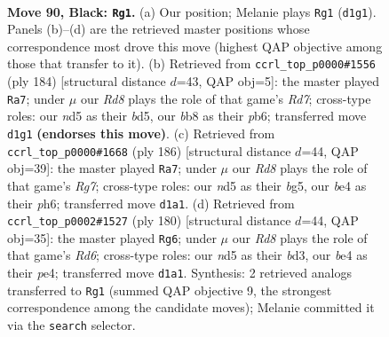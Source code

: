 \documentclass[11pt]{article}
\begin{document}
\clearpage

\begin{figure}[p]\centering
\begin{subfigure}{0.46\textwidth}\centering
\resizebox{\linewidth}{!}{%
\newchessgame
\chessboard[
  setfen={1B4k1/8/1P3R2/3N4/P3B1b1/7p/2K5/3r4 b - - 2 90},
  showmover=false,
  pgfstyle=straightmove, color=movearrow, markmove={d1-g1}
]}
\caption{}
\end{subfigure}\hfill
\begin{subfigure}{0.46\textwidth}\centering
\resizebox{\linewidth}{!}{%
\newchessgame
\chessboard[
  setfen={5k2/3R4/1p2p3/1B1bb3/P5K1/8/8/8 w - - 1 93},
  showmover=false,
  pgfstyle=straightmove, color=movearrow, markmove={d7-a7}
]}
\caption{}
\end{subfigure}
\\[4pt]
\begin{subfigure}{0.46\textwidth}\centering
\resizebox{\linewidth}{!}{%
\newchessgame
\chessboard[
  setfen={5k2/6R1/4K2p/6b1/7r/2B5/8/8 w - - 4 94},
  showmover=false,
  pgfstyle=straightmove, color=movearrow, markmove={g7-a7}
]}
\caption{}
\end{subfigure}\hfill
\begin{subfigure}{0.46\textwidth}\centering
\resizebox{\linewidth}{!}{%
\newchessgame
\chessboard[
  setfen={8/4k3/3R4/4B3/4pP2/3bP3/5r2/3K4 w - - 27 91},
  showmover=false,
  pgfstyle=straightmove, color=movearrow, markmove={d6-g6}
]}
\caption{}
\end{subfigure}
\caption{\textbf{Move 90, Black: \texttt{Rg1}.} (a) Our position; Melanie plays \texttt{Rg1} (\texttt{d1g1}). Panels (b)--(d) are the retrieved master positions whose correspondence most drove this move (highest QAP objective among those that transfer to it). (b) Retrieved from \texttt{ccrl\_top\_p0000\#1556} (ply 184) [structural distance $d$=43, QAP obj=5]: the master played \texttt{Ra7}; under $\mu$ our \emph{Rd8} plays the role of that game's \emph{Rd7}; cross-type roles: our \emph{n}d5 as their \emph{b}d5, our \emph{b}b8 as their \emph{p}b6; transferred move \texttt{d1g1} \textbf{(endorses this move)}. (c) Retrieved from \texttt{ccrl\_top\_p0000\#1668} (ply 186) [structural distance $d$=44, QAP obj=39]: the master played \texttt{Ra7}; under $\mu$ our \emph{Rd8} plays the role of that game's \emph{Rg7}; cross-type roles: our \emph{n}d5 as their \emph{b}g5, our \emph{b}e4 as their \emph{p}h6; transferred move \texttt{d1a1}. (d) Retrieved from \texttt{ccrl\_top\_p0002\#1527} (ply 180) [structural distance $d$=44, QAP obj=35]: the master played \texttt{Rg6}; under $\mu$ our \emph{Rd8} plays the role of that game's \emph{Rd6}; cross-type roles: our \emph{n}d5 as their \emph{b}d3, our \emph{b}e4 as their \emph{p}e4; transferred move \texttt{d1a1}. Synthesis: 2 retrieved analogs transferred to \texttt{Rg1} (summed QAP objective 9, the strongest correspondence among the candidate moves); Melanie committed it via the \texttt{search} selector.}
\label{fig:thought-m179}
\end{figure}
\end{document}
